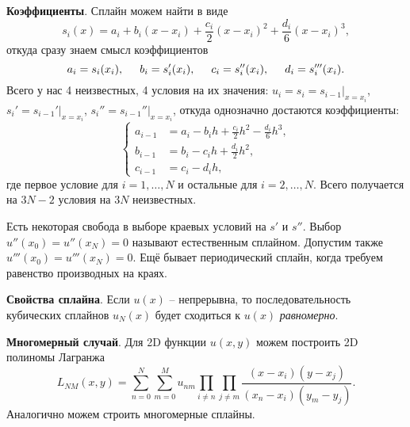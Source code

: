 \textbf{Коэффициенты}.
Сплайн можем найти в виде
\begin{equation*}
	s_i (x) = a_i + b_i (x-x_i) + \frac{c_i}{2} (x-x_i)^2 + \frac{d_i}{6} (x-x_i)^3,
\end{equation*}
откуда сразу знаем смысл коэффициентов
\begin{equation*}
	a_i = s_i(x_i),
	\hspace{5 mm} 
	b_i = s_i' (x_i), 
	\hspace{5 mm} 
	c_i = s_i''(x_i),
	\hspace{5 mm} 
	d_i = s_i'''(x_i).
\end{equation*}
Всего у нас 4 неизвестных, 4 условия на их значения: $u_i = s_i=s_{i-1}|_{x=x_i}$, $s_i'=s_{i-1}'|_{x=x_i}$, $s_i''=s_{i-1}''|_{x=x_i}$, откуда однозначно достаются коэффициенты:
\begin{equation*}
	\left\{\begin{aligned}
	    a_{i-1} &= a_i - b_i h  + \tfrac{c_i}{2} h^2 - \tfrac{d_i}{6} h^3, \\
	    b_{i-1} &= b_i - c_i h + \tfrac{d_i}{2} h^2, \\
		c_{i-1}	&= c_i - d_i h,
	\end{aligned}\right.
\end{equation*}
где первое условие для $i=1,\ldots,N$ и остальные для $i=2, \ldots, N$. 
Всего получается на $3 N-2$ условия на $3 N$ неизвестных. 

Есть некоторая свобода в выборе краевых условий на $s'$ и $s''$. Выбор $u''(x_0) = u''(x_N) = 0$ называют естественным сплайном. Допустим также $u'''(x_0) = u'''(x_N) = 0$. Ещё бывает периодический сплайн, когда требуем равенство производных на краях. 

\textbf{Свойства сплайна}. Если $u(x)$ -- непрерывна, то последовательность кубических сплайнов $u_N (x)$ будет сходиться к $u(x)$ \textit{равномерно}. 


\textbf{Многомерный случай}. Для 2D функции $u(x, y)$ можем построить 2D полиномы Лагранжа
\begin{equation*}
	L_{NM} (x, y) = \sum_{n=0}^{N} \sum_{m=0}^{M} u_{nm} \prod_{i \neq n} \prod_{j \neq m} \frac{(x-x_i) (y-x_j)}{(x_n -x_i)(y_m-y_j)}.
\end{equation*}
Аналогично можем строить многомерные сплайны. 
